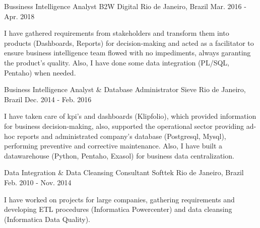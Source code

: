 \begin{cventries}
  \cventry
    {Bussiness Intelligence Analyst} %
    {B2W Digital} %
    {Rio de Janeiro, Brazil} %
    {Mar. 2016 - Apr. 2018} %
    {
      \begin{cvitems} %
        I have gathered requirements from stakeholders and transform them into products (Dashboards, Reports) for decision-making and acted as a facilitator to ensure business intelligence team flowed with no impediments, always garanting the product's quality. Also, I have done some data integration (PL/SQL, Pentaho) when needed.
      \end{cvitems}
    }

  \cventry
    {Business Intelligence Analyst \& Database Administrator} %
    {Sieve} %
    {Rio de Janeiro, Brazil} %
    {Dec. 2014 - Feb. 2016} %
    {
      \begin{cvitems} %
       I have taken care of kpi's and dashboards (Klipfolio), which provided information for business decision-making, also, supported the operational sector providing ad-hoc reports and administrated company's database (Postgresql, Mysql), performing preventive and corrective maintenance. Also, I have built a datawarehouse (Python, Pentaho, Exasol) for business data centralization.
      \end{cvitems}
    }

  \cventry
    {Data Integration \& Data Cleansing Consultant} %
    {Softtek} %
    {Rio de Janeiro, Brazil} %
    {Feb. 2010 - Nov. 2014} %
    {
      \begin{cvitems} %
        I have worked on projects for large companies, gathering requirements and developing ETL procedures (Informatica Powercenter) and data cleansing (Informatica Data Quality).
      \end{cvitems}
    }

\end{cventries}
